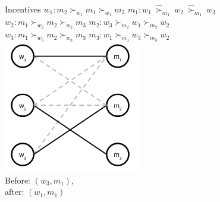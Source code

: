 \begin{frame}{Incentives}
    $w_1: m_2 \succ_{w_1} m_1 \succ_{w_1} m_3$ \tab $m_1: w_1 \ \hat{\succ}_{m_1} \ w_2 \ \hat{\succ}_{m_1} \ w_3$ \\
    $w_2: m_1 \succ_{w_2} m_2 \succ_{w_2} m_3$ \tab $m_2: w_3 \succ_{m_2} w_1 \succ_{m_2} w_2$ \\
    $w_3: m_1 \succ_{w_3} m_2 \succ_{w_3} m_3$ \tab $m_3: w_1 \succ_{m_3} w_3 \succ_{m_3} w_2$ \\
    \centering
    \includegraphics[width=6cm]{img/matching/dai6.png} \\
    Before: $(w_3,m_1)$, \\ after: $(w_1,m_1)$
\end{frame}